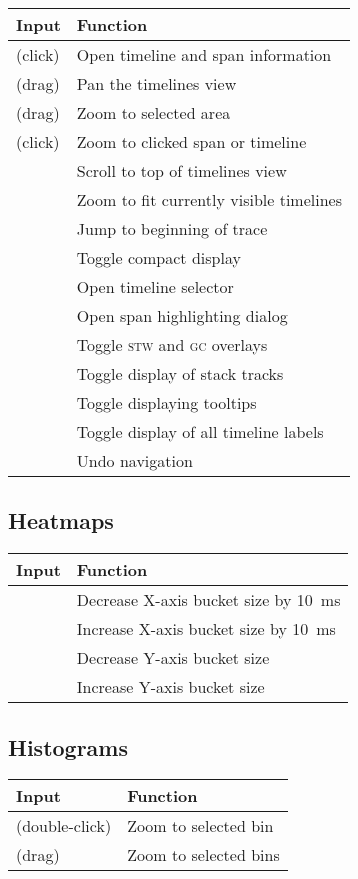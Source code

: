 \documentclass[10pt,letterpaper,oneside,openany,english]{memoir}
\newcommand{\shortcut}{\ctrl{} or \cmdmac}
\newenvironment{keybindings}{%
\begingroup
\def\arraystretch{1.5}%
\begin{tabular}{ll}
  Input & Function \\
  \hline
}{%
\end{tabular}
\endgroup
}
\begin{document}
\begin{keybindings}
  \keys{LMB} (click) & Open timeline and span information \\
  \keys{LMB} (drag) & Pan the timelines view \\
  \keys{\shortcut + LMB} (drag) & Zoom to selected area \\
  \keys{\shortcut + LMB} (click) & Zoom to clicked span or timeline \\
  \keys{Home} & Scroll to top of timelines view \\
  \keys{\shortcut + Home} & Zoom to fit currently visible timelines \\
  \keys{\shift + Home} & Jump to beginning of trace \\
  \keys{C} & Toggle compact display \\
  \keys{G} & Open timeline selector \\
  \keys{H} & Open span highlighting dialog \\
  \keys{O} & Toggle \textsc{stw} and \textsc{gc} overlays \\
  \keys{S} & Toggle display of stack tracks \\
  \keys{T} & Toggle displaying tooltips \\
  \keys{X} & Toggle display of all timeline labels \\
  \keys{\shortcut + Z} &  Undo navigation
\end{keybindings}

\subsection*{Heatmaps}

\begin{keybindings}
  \keys{\arrowkey{<}} & Decrease X-axis bucket size by \qty{10}{\milli\second} \\
  \keys{\arrowkey{>}} & Increase X-axis bucket size by \qty{10}{\milli\second} \\
  \keys{\arrowkey{v}} & Decrease Y-axis bucket size \\
  \keys{\arrowkey{^}} & Increase Y-axis bucket size
\end{keybindings}

\subsection*{Histograms}

\begin{keybindings}
  \keys{LMB} (double-click) & Zoom to selected bin \\
  \keys{\shortcut + LMB} (drag) & Zoom to selected bins
\end{keybindings}
\end{document}
